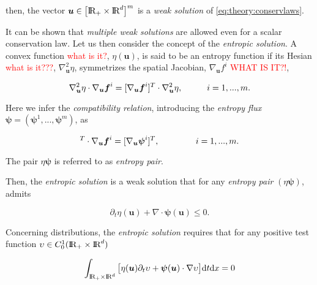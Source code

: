 then, the vector $\boldsymbol{u}\in\big[\text{I\!R}_{+}\times\text{I\!R}^d\big]^m$ is a \textit{weak solution} of \ref{eq:theory:conservlaws}.

It can be shown that \textit{multiple weak solutions} are allowed even for a scalar conservation law. 
Let us then consider the concept of the \textit{entropic solution}. 
A convex function \textcolor{red}{what is it?}, $\eta(\boldsymbol{u})$, is said to be an entropy function if its Hesian \textcolor{red}{what is it???}, $\nabla_{\boldsymbol{u}}^2\eta$, symmetrizes the spatial Jacobian, $\nabla_{\boldsymbol{u}}f^i$ \textcolor{red}{WHAT IS IT?!},

\begin{equation}
\nabla_{\boldsymbol{u}}^2\eta\cdot\nabla_{\boldsymbol{u}}\boldsymbol{f}^i = [\nabla_{\boldsymbol{u}}\boldsymbol{f}^i]^{T}\cdot\nabla_{\boldsymbol{u}}^2\eta, \hspace{10mm} i = 1, ... , m.
\end{equation}

Here we infer the \textit{compatibility relation}, introducing the \textit{entropy flux} $\boldsymbol{\psi} = (\boldsymbol{\psi}^1,...,\boldsymbol{\psi}^m)$, as 

\begin{equation}
[\nabla_{\boldsymbol{u}}\eta]^T\cdot\nabla_{\boldsymbol{u}}\boldsymbol{f}^i = [\nabla_{\boldsymbol{u}}\boldsymbol{\psi}^i]^T, \hspace{15mm} i = 1,...,m.
\end{equation}

The pair $\eta\boldsymbol{\psi}$ is referred to as \textit{entropy pair}.

Then, the \textit{entropic solution} is a weak solution that for any \textit{entropy pair} $(\eta\boldsymbol{\psi})$, admits

\begin{equation}
\partial_t\eta(\boldsymbol{u}) + \nabla\cdot\boldsymbol{\psi}(\boldsymbol{u})\leq 0.
\end{equation}

Concerning distributions, the \textit{entropic solution} requires that for any positive test function $\upsilon\in C_0 ^1 (\text{I\!R}_+\times\text{I\!R}^d)$  

\begin{equation}
\int_{\text{I\!R}_+\times\text{I\!R}^d} \big[\eta(\boldsymbol{u})\partial_t\upsilon + \boldsymbol{\psi}(\boldsymbol{u}) \cdot \nabla\upsilon \big]\text{d}t\text{d}x = 0
\end{equation}

